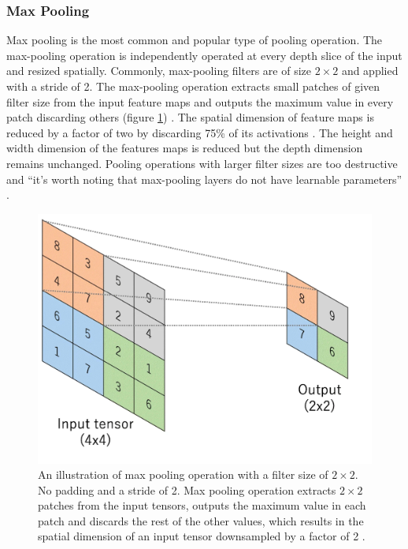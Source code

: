 \subsubsection{Max Pooling}
Max pooling is the most common and popular type of pooling operation. The max-pooling operation is independently operated at every depth slice of the input and resized spatially. Commonly, max-pooling filters are of size $2 \times 2$ and applied with a stride of 2. The max-pooling operation extracts small patches of given filter size from the input feature maps and outputs the maximum value in every patch discarding others (figure \ref{fig:PoolingLayer}) \cite{goodfellow2017deep}. The spatial dimension of feature maps is reduced by a factor of two by discarding 75\% of its activations \cite{kumar2018ordinal}. The height and width dimension of the features maps is reduced but the depth dimension remains unchanged. Pooling operations with larger filter sizes are too destructive and ``it's worth noting that max-pooling layers do not have learnable parameters'' \cite{articleCNNs}.


\begin{figure}[H]
        \begin{center}
	    \includegraphics[scale=0.50]{images/Fundamentals/PoolingLayer.png}
	    \caption[An illustration of Max Pooling Operation.]{An illustration of max pooling operation with a filter size of $2 \times 2$. No padding and a stride of 2. Max pooling operation extracts $2 \times 2$ patches from the input tensors, outputs the maximum value in each patch and discards the rest of the other values, which results in the spatial dimension of an input tensor downsampled by a factor of 2 \cite{articleCNNs}.}
	    \label{fig:PoolingLayer}
	    \end{center}
\end{figure}

